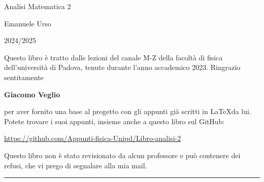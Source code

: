 \documentclass[a4paper]{book}
\begin{document}
	


\begin{titlepage}
	\vspace*{20mm}
	\begin{center}
	\Huge Analisi Matematica 2
	
	{\Large Emanuele Urso}
	
	\small{\href{mailto:emanuele.urso@proton.me}{\color{black}{emanuele.urso@proton.me} }}
	
	2024/2025
	\end{center}
	
	
	\vfill
	
	Questo libro è tratto dalle lezioni del canale M-Z della facoltà di fisica dell'università di Padova, tenute durante l'anno accademico 2023. Ringrazio sentitamente
	
	{\centering \large \textbf{Giacomo Veglio} \par}
	
	per aver fornito una base al progetto con gli appunti già scritti in \LaTeX da lui. Potete trovare i suoi appunti, insieme anche a questo libro sul GitHub: 
	
	{\centering \color{blue}
	\url{https://github.com/Appunti-fisica-Unipd/Libro-analisi-2} \par} 
	
	Questo libro non è stato revisionato da alcun professore e può contenere dei refusi, che vi prego di segnalare alla mia mail.
		
	\vspace{3em}
	
	
	\begin{center}
		\rule{.9\textwidth}{0.4pt}%
	\end{center}
\end{titlepage}
	
	\hypersetup{linkcolor=black}
	\tableofcontents   
	
\newpage

\setlength\parskip{\baselineskip}



\newpage



\newpage




\newpage



\newpage


\end{document}
